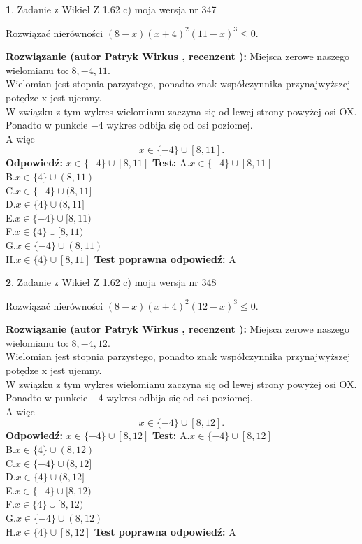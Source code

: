 \documentclass[12pt, a4paper]{article}
\theoremstyle{definition} %
\newtheorem{zad}{}
\newcommand{\zadStart}[1]{\begin{zad}#1\newline}
\newcommand{\zadStop}{\end{zad}}
\newcommand{\rozwStart}[2]{\noindent \textbf{Rozwiązanie (autor #1 , recenzent #2): }\newline}
\newcommand{\rozwStop}{\newline}
\newcommand{\odpStart}{\noindent \textbf{Odpowiedź:}\newline}
\newcommand{\odpStop}{\newline}
\newcommand{\testStart}{\noindent \textbf{Test:}\newline}
\newcommand{\testStop}{\newline}
\newcommand{\kluczStart}{\noindent \textbf{Test poprawna odpowiedź:}\newline}
\newcommand{\kluczStop}{\newline}
\begin{document}
\zadStart{Zadanie z Wikieł Z 1.62 c) moja wersja nr 347}

Rozwiązać nierówności $(8-x)(x+4)^{2}(11-x)^{3}\le0$.
\zadStop
\rozwStart{Patryk Wirkus}{}
Miejsca zerowe naszego wielomianu to: $8, -4, 11$.\\
Wielomian jest stopnia parzystego, ponadto znak współczynnika przy\linebreak najwyższej potędze x jest ujemny.\\ W związku z tym wykres wielomianu zaczyna się od lewej strony powyżej osi OX.\\
Ponadto w punkcie $-4$ wykres odbija się od osi poziomej.\\
A więc $$x \in \{-4\} \cup [8,11].$$
\rozwStop
\odpStart
$x \in \{-4\} \cup [8,11]$
\odpStop
\testStart
A.$x \in \{-4\} \cup [8,11]$\\
B.$x \in \{4\} \cup (8,11)$\\
C.$x \in \{-4\} \cup (8,11]$\\
D.$x \in \{4\} \cup (8,11]$\\
E.$x \in \{-4\} \cup [8,11)$\\
F.$x \in \{4\} \cup [8,11)$\\
G.$x \in \{-4\} \cup (8,11)$\\
H.$x \in \{4\} \cup [8,11]$
\testStop
\kluczStart
A
\kluczStop



\zadStart{Zadanie z Wikieł Z 1.62 c) moja wersja nr 348}

Rozwiązać nierówności $(8-x)(x+4)^{2}(12-x)^{3}\le0$.
\zadStop
\rozwStart{Patryk Wirkus}{}
Miejsca zerowe naszego wielomianu to: $8, -4, 12$.\\
Wielomian jest stopnia parzystego, ponadto znak współczynnika przy\linebreak najwyższej potędze x jest ujemny.\\ W związku z tym wykres wielomianu zaczyna się od lewej strony powyżej osi OX.\\
Ponadto w punkcie $-4$ wykres odbija się od osi poziomej.\\
A więc $$x \in \{-4\} \cup [8,12].$$
\rozwStop
\odpStart
$x \in \{-4\} \cup [8,12]$
\odpStop
\testStart
A.$x \in \{-4\} \cup [8,12]$\\
B.$x \in \{4\} \cup (8,12)$\\
C.$x \in \{-4\} \cup (8,12]$\\
D.$x \in \{4\} \cup (8,12]$\\
E.$x \in \{-4\} \cup [8,12)$\\
F.$x \in \{4\} \cup [8,12)$\\
G.$x \in \{-4\} \cup (8,12)$\\
H.$x \in \{4\} \cup [8,12]$
\testStop
\kluczStart
A
\kluczStop
\end{document}
